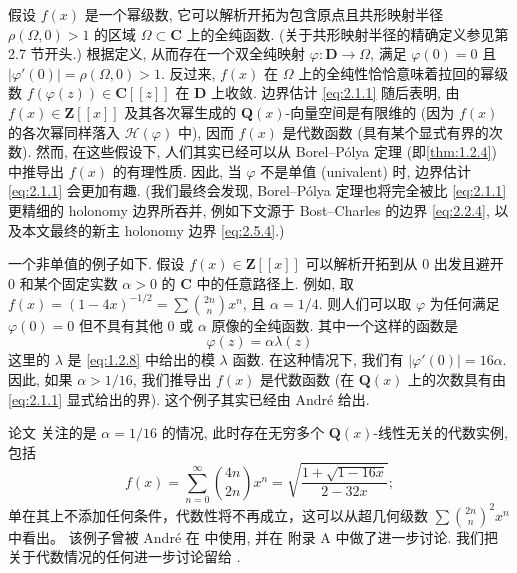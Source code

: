 \begin{remark}\label{rem:2.1.2}
假设 \(f(x)\) 是一个幂级数, 它可以解析开拓为包含原点且共形映射半径 \(\rho(\Omega,0) > 1\) 的区域 \(\Omega \subset \mathbf{C}\) 上的全纯函数.
(关于共形映射半径的精确定义参见第 2.7 节开头.)
根据定义, 从而存在一个双全纯映射 \(\varphi : \mathbf{D} \to \Omega\), 满足 \(\varphi(0) = 0\) 且 \(\lvert\varphi'(0)\rvert = \rho(\Omega,0) > 1\).
反过来, \(f(x)\) 在 \(\Omega\) 上的全纯性恰恰意味着拉回的幂级数 \(f(\varphi(z)) \in \mathbf{C}[\![z]\!]\) 在 \(\mathbf{D}\) 上收敛.
边界估计 \eqref{eq:2.1.1} 随后表明, 由 \(f(x) \in \mathbf{Z}[\![x]\!]\) 及其各次幂生成的 \(\mathbf{Q}(x)\)-向量空间是有限维的 (因为 \(f(x)\) 的各次幂同样落入 \(\mathcal{H}(\varphi)\) 中), 
因而 \(f(x)\) 是代数函数 (具有某个显式有界的次数).
然而, 在这些假设下, 人们其实已经可以从 Borel--P{\'o}lya 定理 (即\autoref{thm:1.2.4}) 中推导出 \(f(x)\) 的有理性质.
因此, 当 \(\varphi\) 不是单值 (univalent) 时, 边界估计 \eqref{eq:2.1.1} 会更加有趣.
(我们最终会发现, Borel--P{\'o}lya 定理也将完全被比 \eqref{eq:2.1.1} 更精细的 holonomy 边界所吞并, 
例如下文源于 Bost--Charles \cite{BC22} 的边界 \eqref{eq:2.2.4}, 以及本文最终的新主 holonomy 边界 \eqref{eq:2.5.4}.)

一个非单值的例子如下. 
假设 \(f(x) \in \mathbf{Z}[\![x]\!]\) 可以解析开拓到从 \(0\) 出发且避开 \(0\) 和某个固定实数 \(\alpha > 0\) 的 \(\mathbf{C}\) 中的任意路径上.
例如, 取 \(f(x) = (1-4x)^{-1/2} = \sum {2n \choose n} x^n\), 且 \(\alpha = 1/4\).
则人们可以取 \(\varphi\) 为任何满足 \(\varphi(0) = 0\) 但不具有其他 \(0\) 或 \(\alpha\) 原像的全纯函数.
其中一个这样的函数是
\[ \varphi(z) = \alpha \lambda(z) \]
这里的 \(\lambda\) 是 \eqref{eq:1.2.8} 中给出的模 \(\lambda\) 函数.
在这种情况下, 我们有 \(\lvert\varphi'(0)\rvert = 16\alpha\).
因此, 如果 \(\alpha > 1/16\), 我们推导出 \(f(x)\) 是代数函数 (在 \(\mathbf{Q}(x)\) 上的次数具有由 \eqref{eq:2.1.1} 显式给出的界).
这个例子其实已经由 Andr{\'e} 给出.

论文 \cite{CDT21} 关注的是 \(\alpha = 1/16\) 的情况, 此时存在无穷多个 \(\mathbf{Q}(x)\)-线性无关的代数实例, 包括
\[ f(x) = \sum_{n=0}^{\infty} {4n \choose 2n} x^n = \sqrt{\frac{1 + \sqrt{1 - 16x}}{2 - 32x}}; \]
单在其上不添加任何条件，代数性将不再成立，这可以从超几何级数 \(\sum {2n \choose n}^2 x^n\) 中看出。
该例子曾被 Andr{\'e} 在 \cite{And96} 中使用, 并在 \cite{And04} 附录 A 中做了进一步讨论.
我们把关于代数情况的任何进一步讨论留给 \cite{CDT21}.

\end{remark}



